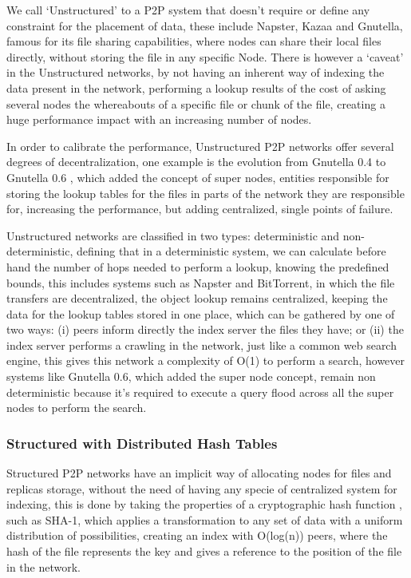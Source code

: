 We call `Unstructured' to a P2P system that doesn't require or define any constraint for the placement of data, these include Napster, Kazaa and Gnutella, famous for its file sharing capabilities, where nodes can share their local files directly, without storing the file in any specific Node. There is however a `caveat' in the Unstructured networks, by not having an inherent way of indexing the data present in the network, performing a lookup results of the cost of asking several nodes the whereabouts of a specific file or chunk of the file, creating a huge performance impact with an increasing number of nodes. 

In order to calibrate the performance, Unstructured P2P networks offer several degrees of decentralization, one example is the evolution from Gnutella 0.4\cite{Definition2003} to Gnutella 0.6 \cite{T.Klingberg2002}\cite{Ripeanu2002a}, which added the concept of super nodes, entities responsible for storing the lookup tables for the files in parts of the network they are responsible for, increasing the performance, but adding centralized, single points of failure. 

Unstructured networks are classified\cite{Ranjan2006} in two types: deterministic and non-deterministic, defining that in a deterministic system, we can calculate before hand the number of hops needed to perform a lookup, knowing the predefined bounds, this includes systems such as Napster and BitTorrent\cite{Cohen2009}, in which the file transfers are decentralized, the object lookup remains centralized, keeping the data for the lookup tables stored in one place, which can be gathered by one of two ways: (i) peers inform directly the index server the files they have; or (ii) the index server performs a crawling in the network, just like a common web search engine, this gives this network a complexity of O(1) to perform a search, however systems like Gnutella 0.6, which added the super node concept, remain non deterministic because it's required to execute a query flood across all the super nodes to perform the search.

\subsubsection{Structured with Distributed Hash Tables}\label{par:Structured with Distributed Hash Tables}

Structured P2P networks have an implicit way of allocating nodes for files and replicas storage, without the need of having any specie of centralized system for indexing, this is done by taking the properties of a cryptographic hash function \cite{Bakhtiari}\cite{Kargerl}\cite{Preneel1999}, such as SHA-1\cite{D.Eastlake3rdMotorola;P.JonesSystems2001}, which applies a transformation to any set of data with a uniform distribution of possibilities, creating an index with O(log(n)) peers, where the hash of the file represents the key and gives a reference to the position of the file in the network.

